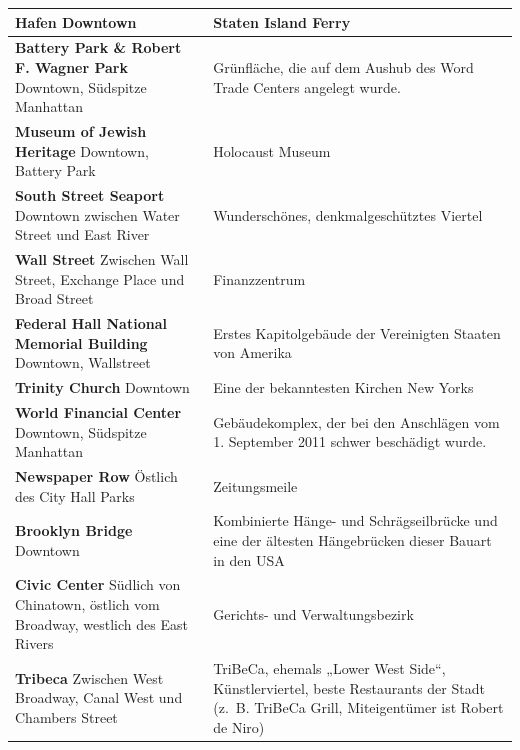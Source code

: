 \documentclass[fontsize=14pt,a4paper,headinclude,DIV=calc,automark]{scrbook}
\begin{document}
{\begin{longtable}{
    >{\raggedright\arraybackslash\columncolor{tablecellblue}}p{5.1cm}
    >{\raggedright\arraybackslash\columncolor{rightcolumn}}p{10cm}
    }
    \textbf{Hafen}\newline
    Downtown & Staten Island Ferry \\ \midrule
    \textbf{Battery Park \& Robert F. Wagner Park}\newline
    Downtown, Südspitze Manhattan & Grünfläche, die auf dem Aushub des Word Trade Centers angelegt wurde. \\ \midrule
    \textbf{Museum of Jewish Heritage}\newline
    Downtown, Battery Park & Holocaust Museum \\ \midrule
    \textbf{South Street Seaport}\newline
    Downtown zwischen Water Street und East River & Wunderschönes, denkmalgeschütztes Viertel \\ \midrule
    \textbf{Wall Street}\newline
    Zwischen Wall Street, Exchange Place und Broad Street & Finanzzentrum \\ \midrule
    \textbf{Federal Hall National Memorial Building }\newline
    Downtown, Wallstreet & Erstes Kapitolgebäude der Vereinigten Staaten von Amerika \\ \midrule
    \textbf{Trinity Church}\newline
    Downtown & Eine der bekanntesten Kirchen New Yorks \\ \midrule
    \textbf{World Financial Center}\newline
    Downtown, Südspitze Manhattan & Gebäudekomplex, der bei den Anschlägen vom 1. September 2011 schwer beschädigt wurde. \\ \midrule
    \textbf{Newspaper Row}\newline
    Östlich des City Hall Parks & Zeitungsmeile \\ \midrule
    \textbf{Brooklyn Bridge}\newline
    Downtown & Kombinierte Hänge- und Schrägseilbrücke und eine der ältesten Hängebrücken dieser Bauart in den USA \\ \midrule
    \textbf{Civic Center}\newline
    Südlich von Chinatown, östlich vom Broadway, westlich des East Rivers & Gerichts- und Verwaltungsbezirk \\ \midrule
    \textbf{Tribeca}\newline
    Zwischen West Broadway, Canal West und Chambers Street & TriBeCa, ehemals „Lower West Side“, Künstlerviertel, beste Restaurants der Stadt (z.~B. TriBeCa Grill, Miteigentümer ist Robert de Niro) \\ \midrule

\end{longtable}}
\end{document}
